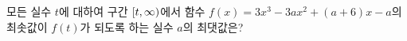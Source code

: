모든 실수 $t$에 대하여 구간 $[t{,}\mkern3mu\mathopen{}\infty)$에서 함수 $f(x)=3x^3-3ax^2+(a+6)x-a$의 최솟값이 $f(t)$가 되도록 하는 실수 $a$의 최댓값은?
